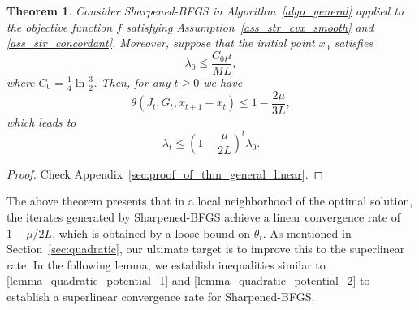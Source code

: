 \documentclass[11pt]{article}
\numberwithin{assumption}{section}
\numberwithin{remark}{section}
\newtheorem{theorem}{Theorem}
\numberwithin{theorem}{section}
\begin{document}
\begin{theorem}\label{thm_general_linear}
Consider Sharpened-BFGS in Algorithm~\ref{algo_general} applied to the objective function $f$ satisfying Assumption~\ref{ass_str_cvx_smooth} and \ref{ass_str_concordant}. Moreover, suppose that the initial point $x_0$ satisfies
\begin{equation}\label{thm_general_linear_1}
\lambda_0 \leq \frac{C_0\mu}{ML}, 
\end{equation}
where  $C_0 = \frac{1}{4}\ln{\frac{3}{2}}$.
Then, for any $t \geq 0$ we have
\begin{equation}\label{thm_general_linear_2}
    \theta(J_t, G_t, x_{t + 1} - x_{t}) \leq 1 - \frac{2\mu}{3L},
\end{equation}
which leads to
\begin{equation}\label{thm_general_linear_3}
    \lambda_t \leq (1 - \frac{\mu}{2L})^{t}\lambda_0.
\end{equation}
\end{theorem}
\vspace{-2mm}
\begin{proof}
Check Appendix~\ref{sec:proof_of_thm_general_linear}.
\end{proof}

The above theorem presents that in a local neighborhood of the optimal solution, the iterates generated by Sharpened-BFGS achieve a linear convergence rate of $1 - {\mu}/{2L}$, which is obtained by a loose bound on $\theta_t$. As mentioned in Section~\ref{sec:quadratic}, our ultimate target is to improve this to the superlinear rate. In the following lemma, we establish inequalities similar to \eqref{lemma_quadratic_potential_1} and \eqref{lemma_quadratic_potential_2} to establish a superlinear convergence rate for Sharpened-BFGS.
\end{document}
